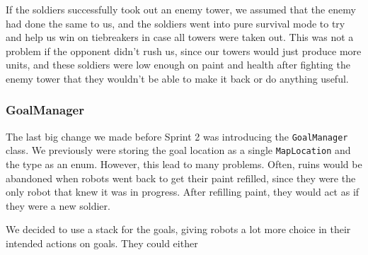 \medskip

If the soldiers successfully took out an enemy tower, we assumed that the enemy had done the same to us, and the soldiers went into pure survival mode to try and help us win on tiebreakers in case all towers were taken out. This was not a problem if the opponent didn't rush us, since our towers would just produce more units, and these soldiers were low enough on paint and health after fighting the enemy tower that they wouldn't be able to make it back or do anything useful.

\subsubsection{GoalManager}

The last big change we made before Sprint 2 was introducing the \verb|GoalManager| class. We previously were storing the goal location as a single \verb|MapLocation| and the type as an enum. However, this lead to many problems. Often, ruins would be abandoned when robots went back to get their paint refilled, since they were the only robot that knew it was in progress. After refilling paint, they would act as if they were a new soldier.

\medskip

We decided to use a stack for the goals, giving robots a lot more choice in their intended actions on goals. They could either 